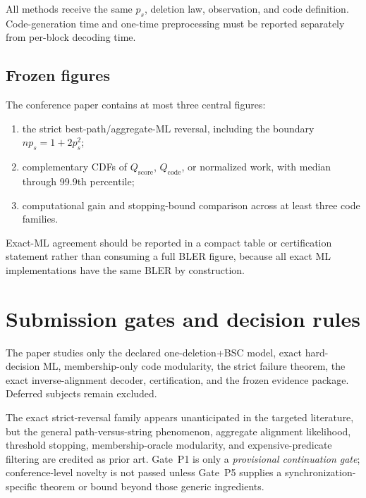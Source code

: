 \documentclass[11pt]{article}
\theoremstyle{definition}
\theoremstyle{remark}
\begin{document}
All methods receive the same $p_s$, deletion law, observation, and code definition. Code-generation time and one-time preprocessing must be reported separately from per-block decoding time.

\subsection{Frozen figures}

The conference paper contains at most three central figures:
\begin{enumerate}
  \item the strict best-path/aggregate-ML reversal, including the boundary $np_s=1+2p_s^2$;
  \item complementary CDFs of $Q_{\mathrm{score}}$, $Q_{\mathrm{code}}$, or normalized work, with median through 99.9th percentile;
  \item computational gain and stopping-bound comparison across at least three code families.
\end{enumerate}

Exact-ML agreement should be reported in a compact table or certification statement rather than consuming a full BLER figure, because all exact ML implementations have the same BLER by construction.

\section{Submission gates and decision rules}
\label{sec:gates}

\begin{gatebox}
The paper studies only the declared one-deletion+BSC model, exact hard-decision ML, membership-only code modularity, the strict failure theorem, the exact inverse-alignment decoder, certification, and the frozen evidence package. Deferred subjects remain excluded.
\end{gatebox}

\begin{gatebox}
The exact strict-reversal family appears unanticipated in the targeted literature, but the general path-versus-string phenomenon, aggregate alignment likelihood, threshold stopping, membership-oracle modularity, and expensive-predicate filtering are credited as prior art. Gate~P1 is only a \emph{provisional continuation gate}; conference-level novelty is not passed unless Gate~P5 supplies a synchronization-specific theorem or bound beyond those generic ingredients.
\end{gatebox}
\end{document}
